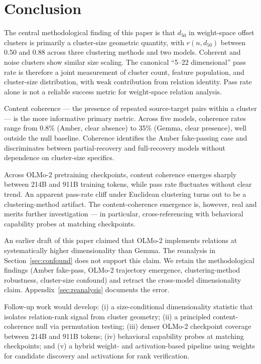 \documentclass[11pt,letterpaper]{article}
\begin{document}
\section{Conclusion}
\label{sec:conclusion}

The central methodological finding of this paper is that $d_{50}$ in weight-space offset clusters is primarily a cluster-size geometric quantity, with $r(n, d_{50})$ between 0.50 and 0.88 across three clustering methods and two models. Coherent and noise clusters show similar size scaling. The canonical ``5--22 dimensional'' pass rate is therefore a joint measurement of cluster count, feature population, and cluster-size distribution, with weak contribution from relation identity. Pass rate alone is not a reliable success metric for weight-space relation analysis.

Content coherence --- the presence of repeated source-target pairs within a cluster --- is the more informative primary metric. Across five models, coherence rates range from 0.8\% (Amber, clear absence) to 35\% (Gemma, clear presence), well outside the null baseline. Coherence identifies the Amber fake-passing case and discriminates between partial-recovery and full-recovery models without dependence on cluster-size specifics.

Across OLMo-2 pretraining checkpoints, content coherence emerges sharply between 214B and 911B training tokens, while pass rate fluctuates without clear trend. An apparent pass-rate cliff under Euclidean clustering turns out to be a clustering-method artifact. The content-coherence emergence is, however, real and merits further investigation --- in particular, cross-referencing with behavioral capability probes at matching checkpoints.

An earlier draft of this paper claimed that OLMo-2 implements relations at systematically higher dimensionality than Gemma. The reanalysis in Section~\ref{sec:confound} does not support this claim. We retain the methodological findings (Amber fake-pass, OLMo-2 trajectory emergence, clustering-method robustness, cluster-size confound) and retract the cross-model dimensionality claim. Appendix~\ref{sec:reanalysis} documents the error.

Follow-up work would develop: (i) a size-conditional dimensionality statistic that isolates relation-rank signal from cluster geometry; (ii) a principled content-coherence null via permutation testing; (iii) denser OLMo-2 checkpoint coverage between 214B and 911B tokens; (iv) behavioral capability probes at matching checkpoints; and (v) a hybrid weight- and activation-based pipeline using weights for candidate discovery and activations for rank verification.
\end{document}
